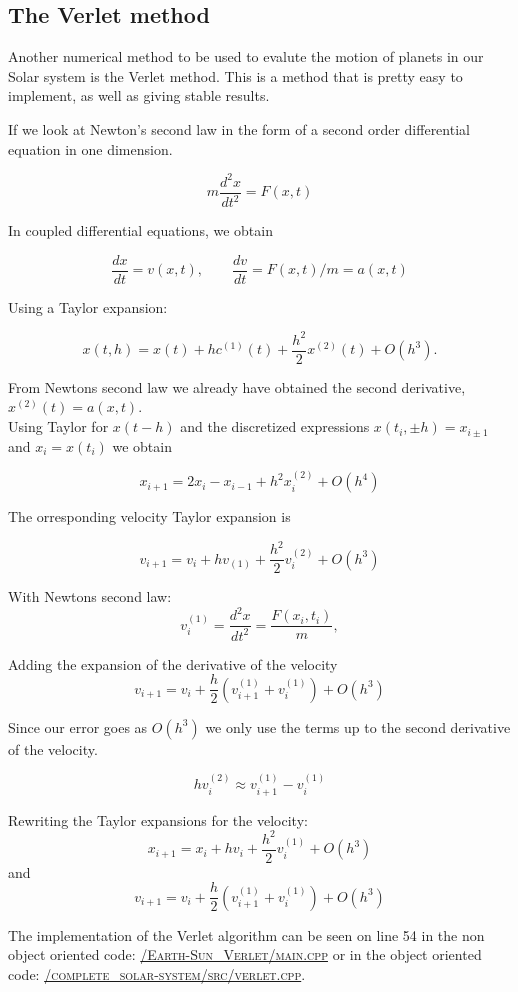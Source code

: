 \documentclass[../main.tex]{subfiles}
\begin{document}
\subsection{The Verlet method}
Another numerical method to be used to evalute the motion of planets in our Solar system is the Verlet method. This is a method that is pretty easy to implement, as well as giving stable results.

If we look at Newton's second law in the form of a second order differential equation in one dimension.

 $$m \frac{d^2x}{dt^2} = F(x,t)$$


In coupled differential equations, we obtain

$$\frac{dx}{dt} = v(x,t),\qquad \frac{dv}{dt} = F(x,t)/m = a(x,t)$$

Using a Taylor expansion:

 $$x(t,h) = x(t) + hc^{(1)}(t) + \frac{h^2}{2}x^{(2)}(t) + O(h^3).$$


From Newtons second law we already have obtained the second derivative, $x^{(2)}(t) = a(x,t)$. \\
Using Taylor for $x(t-h)$ and the discretized expressions $x(t_i,\pm h) = x_{i \pm 1}$ and $x_i = x(t_i)$ we obtain

$$x_{i+1} = 2x_i - x_{i-1} + h^2 x_i^{(2)} + O(h^4)$$

The orresponding velocity Taylor expansion is

$$v_{i+1} = v_i + hv_{(1)} + \frac{h^2}{2} v_i^{(2)} + O(h^3)$$

With Newtons second law:
$$v_i^{(1)} = \frac{d^2x}{dt^2} = \frac{F(x_i, t_i)}{m},$$

Adding the expansion of the derivative of the velocity
$$v_{i+1} = v_i + \frac{h}{2}\left(v_{i+1}^{(1)} + v_i^{(1)}\right) + O(h^3)$$

Since our error goes as $O(h^3)$ we only use the terms up to the second derivative of the velocity.

$$hv_i^{(2)}\approx v_{i+1}^{(1)} - v_i^{(1)}$$

Rewriting the Taylor expansions for the velocity:
$$x_{i+1} = x_i + hv_i + \frac{h^2}{2} v_i^{(1)} + O(h^3)$$
and
$$v_{i+1} = v_i + \frac{h}{2} \left(v_{i+1}^{(1)} + v_i^{(1)}\right) + O(h^3)$$

The implementation of the Verlet algorithm can be seen on line 54 in the non object oriented code: \href{https://github.com/kmaasrud/Project-5/blob/master/code/Earth-Sun_Verlet/main.cpp}{\textsc{/Earth-Sun\_Verlet/main.cpp}} or in the object oriented code: \href{https://github.com/kmaasrud/Project-5/blob/master/code/complete_solar-system/src/verlet.cpp}{\textsc{/complete\_solar-system/src/verlet.cpp}}.
\end{document}

